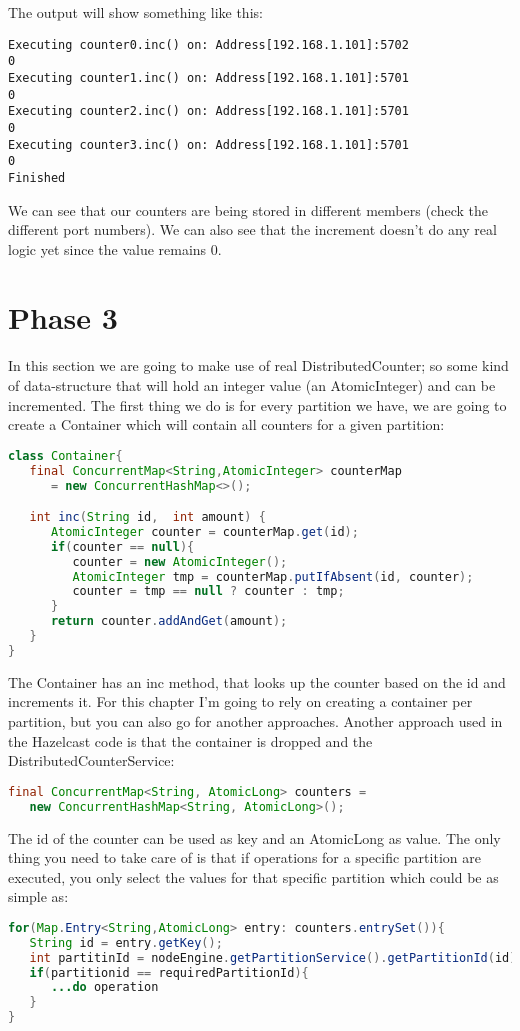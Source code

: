 The output will show something like this:
\begin{lstlisting}
Executing counter0.inc() on: Address[192.168.1.101]:5702
0
Executing counter1.inc() on: Address[192.168.1.101]:5701
0
Executing counter2.inc() on: Address[192.168.1.101]:5701
0
Executing counter3.inc() on: Address[192.168.1.101]:5701
0
Finished
\end{lstlisting}
We can see that our counters are being stored in different members (check the different port numbers). We can also see that the increment doesn't do any real logic yet since the value remains 0.

\section{Phase 3}
In this section we are going to make use of real DistributedCounter; so some kind of data-structure that will hold an integer value (an AtomicInteger) and can be incremented. The first thing we do is for every partition we have, we are going to create a Container which will contain all counters for a given partition:
\begin{lstlisting}[language=java]
class Container{
   final ConcurrentMap<String,AtomicInteger> counterMap 
      = new ConcurrentHashMap<>();

   int inc(String id,  int amount) {
      AtomicInteger counter = counterMap.get(id);
      if(counter == null){
         counter = new AtomicInteger();
         AtomicInteger tmp = counterMap.putIfAbsent(id, counter);
         counter = tmp == null ? counter : tmp;
      }
      return counter.addAndGet(amount);
   }
}
\end{lstlisting}
The Container has an inc method, that looks up the counter based on the id and increments it. For this chapter I'm going to rely on creating a container per partition, but you can also go for another approaches. Another approach used in the Hazelcast code is that the container is dropped and the DistributedCounterService:
\begin{lstlisting}[language=java]
final ConcurrentMap<String, AtomicLong> counters = 
   new ConcurrentHashMap<String, AtomicLong>();
\end{lstlisting}
The id of the counter can be used as key and an AtomicLong as value. The only thing you need to take care of is that if operations for a specific partition are executed, you only select the values for that specific partition which could be as simple as: 
\begin{lstlisting}[language=java]
for(Map.Entry<String,AtomicLong> entry: counters.entrySet()){
   String id = entry.getKey();
   int partitinId = nodeEngine.getPartitionService().getPartitionId(id); 
   if(partitionid == requiredPartitionId){
      ...do operation	
   }
}
\end{lstlisting}

